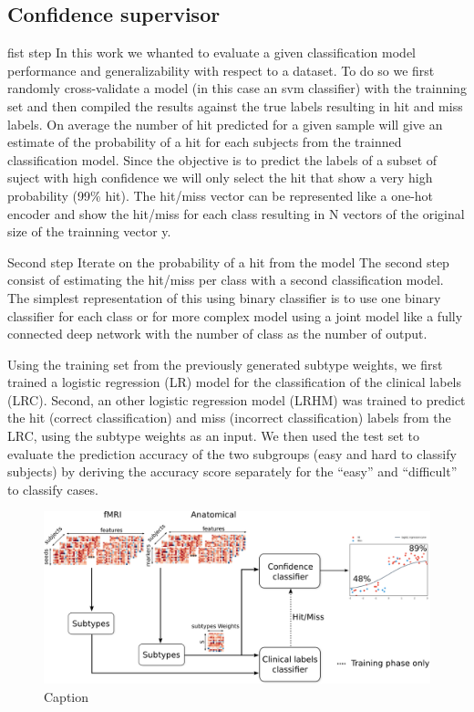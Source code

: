 \documentclass[authoryear]{elsarticle}
\begin{document}
\subsection{Confidence supervisor}


fist step
In this work we whanted to evaluate a given classification model performance and generalizability with respect to a dataset. To do so we first randomly cross-validate a model (in this case an svm classifier) with the trainning set and then compiled the results against the true labels resulting in  hit and miss labels. On average the number of hit predicted for a given sample will give an estimate of the probability of a hit for each subjects from the trainned classification model. Since the objective is to predict the labels of a subset of suject with high confidence we will only select the hit that show a very high probability (99\% hit). The hit/miss vector can be represented like a one-hot encoder and show the hit/miss for each class resulting in N vectors of the original size of the trainning vector y.

Second step
Iterate on the probability of a hit from the model
The second step consist of estimating the hit/miss per class with a second classification model. The simplest representation of this using binary classifier is to use one binary classifier for each class or for more complex model using a joint model like a fully connected deep network with the number of class as the number of output.




Using the training set from the previously generated subtype weights, we first trained a logistic regression (LR) model \cite{Fan2008} for the classification of the clinical labels (LRC). Second, an other logistic regression model (LRHM) was trained to predict the hit (correct classification) and miss (incorrect classification) labels from the LRC, using the subtype weights as an input. We then used the test set to evaluate the prediction accuracy of the two subgroups (easy and hard to classify subjects) by deriving the accuracy score separately for the “easy” and “difficult” to classify cases.

\begin{figure}[tbp]
\centering
\includegraphics[width=\linewidth]{figures/full_model.png}
\caption{Caption}
\label{fig_model_schematic}
\end{figure}
\end{document}
